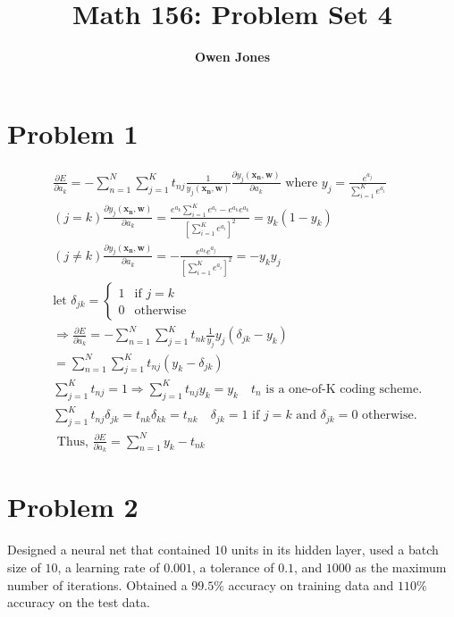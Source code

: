 \documentclass[10pt]{article}
\title{\bf Math 156: Problem Set 4}
\author{\bf Owen Jones}
\begin{document}
\section*{Problem 1}
\begin{align*}
    &\frac{\partial E}{\partial a_k}=-\sum_{n=1}^{N}\sum_{j=1}^{K}t_{nj}\frac{1}{y_j(\mathbf{x_n},\mathbf{w})}\frac{\partial y_j(\mathbf{x_n},\mathbf{w})}{\partial a_k}\text{ where }y_j=\frac{e^{a_j}}{\sum_{i=1}^{K}e^{a_i}}\\
    &(j=k)\frac{\partial y_j(\mathbf{x_n},\mathbf{w})}{\partial a_k}=\frac{e^{a_k}\sum_{i=1}^{K}e^{a_i}-e^{a_k}e^{a_k}}{{[\sum_{i=1}^{K}e^{a_i}]}^2}=y_k(1-y_k)\\
    &(j\neq k) \frac{\partial y_j(\mathbf{x_n},\mathbf{w})}{\partial a_k}=-\frac{e^{a_k}e^{a_j}}{{[\sum_{i=1}^{K}e^{a_i}]}^2}=-y_k y_j\\
    &\text{let }\delta_{jk}=\begin{cases}
        1 & \text{if }j=k\\
        0 & \text{otherwise}
    \end{cases}\\
    &\Rightarrow \frac{\partial E}{\partial a_k}=-\sum_{n=1}^{N}\sum_{j=1}^{K}t_{nk}\frac{1}{y_j}y_j(\delta_{jk}-y_k)\\
    &=\sum_{n=1}^{N}\sum_{j=1}^{K}t_{nj}(y_k-\delta_{jk})\\
    &\sum_{j=1}^{K}t_{nj}=1\Rightarrow\sum_{j=1}^{K}t_{nj}y_k=y_k\quad t_{n}\text{ is a one-of-K coding scheme.}\\
    &\sum_{j=1}^{K}t_{nj}\delta_{jk}=t_{nk}\delta_{kk}=t_{nk}\quad \delta_{jk}=1\text{ if }j=k\text{ and }\delta_{jk}=0\text{ otherwise.}\\
    &\text{ Thus, }\frac{\partial E}{\partial a_k}=\sum_{n=1}^{N}y_k-t_{nk}
\end{align*}
\section*{Problem 2}
Designed a neural net that contained $10$ units in its hidden layer, used a batch size of $10$, a learning rate of $0.001$, a tolerance of $0.1$, and $1000$ as the maximum number of iterations. 
Obtained a $99.5\%$ accuracy on training data and $110\%$ accuracy on the test data.

\end{document}
